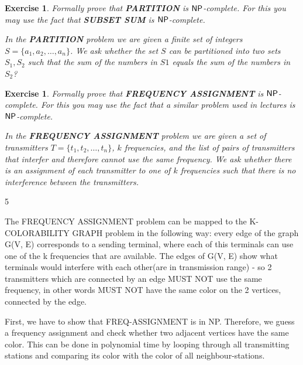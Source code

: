 \documentclass [11pt]{article}
\newtheorem{exercise}[theorem]{Exercise}
\newcommand{\ccfont}[1]{\protect\mathsf{#1}}
\newcommand{\NP}{\ccfont{NP}}
\newcommand{\solution}[1]{\noindent {\bf Solution.}  #1}
\begin{document}
\begin{exercise}
  \label{ex:partition}
  Formally prove that \textbf{PARTITION} is $\NP$-complete. For this you may use
  the fact that \textbf{SUBSET SUM} is $\NP$-complete.   
  
  \smallskip
  \noindent In the \textbf{PARTITION} problem we are given a finite set of integers $S=\{a_1, a_2, \ldots, a_n\}$. We ask whether the set $S$ can be partitioned into two sets $S_1, S_2$ such that the sum of the numbers in $S1$ equals the sum of the numbers in $S_2$? 
  

\end{exercise}


\solution




\begin{exercise}
  \label{ex:frequency}
  Formally prove that \textbf{FREQUENCY ASSIGNMENT} is $\NP$-complete. For this you may use
  the fact that a similar problem used in lectures is $\NP$-complete.
      
    \smallskip
        
  \noindent In the \textbf{FREQUENCY ASSIGNMENT} problem we are given a set of transmitters $T=\{t_1, t_2, \ldots, t_n\}$,  $k$ frequencies, and the list of pairs of transmitters that interfer and therefore cannot use the same frequency. We ask whether there is an assignment of each transmitter to one of $k$ frequencies such that there is no interference between the transmitters. 
            
\end{exercise}

\solution{ 5}

The FREQUENCY ASSIGNMENT problem can be mapped to the K-COLORABILITY GRAPH problem in the following way: every edge of the graph G(V, E) corresponds to a sending terminal, where each of this terminals can use one of the k frequencies that are available. The edges of G(V, E) show what terminals would interfere with each other(are in transmission range) - so 2 transmitters which are connected by  an edge MUST NOT use the same frequency, in other words MUST NOT have the same color on the 2 vertices, connected by the edge.

First, we have to show that FREQ-ASSIGNMENT is in NP. Therefore, we guess a frequency assignment and check whether two adjacent vertices have the same color. This can be done in polynomial time by looping through all transmitting stations and comparing its color with the color of all neighbour-stations.
\end{document}

